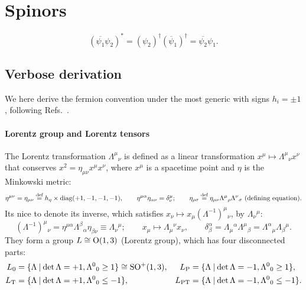 \documentclass[CheatSheet]{subfiles}
\newcommand{\LorTr}[2]{\Lambda^{#1}{}_{#2}}
\newcommand\defeq{\mathrel{\stackrel{\text{def}}=}}
\begin{document}
\changefontsizes{10pt}
\section{Spinors}

\changefontsizes{9pt}
\begin{equation}
 (\overline{\psi_1}\psi_2)^* = (\psi_2)^\dagger(\overline\psi_1)^\dagger = \overline{\psi_2}\psi_1.
\end{equation}


\subsection{Verbose derivation}
We here derive the fermion convention under the most generic with signs $h_i=\pm1$, following
Refs.~\cite{Kugo1}.

\paragraph{Lorentz group and Lorentz tensors}
The Lorentz transformation $\LorTr\mu\nu$ is defined as a linear transformation $x^\mu\mapsto\LorTr\mu\nu x^\nu$ that conserves $x^2=\eta_{\mu\nu}x^\mu x^\nu$, where $x^\mu$ is a spacetime point and $\eta$ is the Minkowski metric:
\begin{equation}
 \eta^{\mu\nu}=\eta_{\mu\nu}\defeq h_\eta\times\diag(+1,-1,-1,-1),\qquad
 \eta^{\mu\alpha}\eta_{\alpha\nu}=\delta^{\mu}_\nu;\qquad
 \eta_{\rho\sigma}\defeq\eta_{\mu\nu}\LorTr\mu\rho\LorTr\nu\sigma ~\text{(defining equation)}.
\label{eq:LorTr}
\end{equation}
Its nice to denote its inverse, which satisfies $x_\nu\mapsto x_\mu(\Lambda^{-1})^\mu{}_\nu$, by $\Lambda_\nu{}^\mu$:
\begin{equation}
 (\Lambda^{-1})^\mu{}_\nu = \eta^{\mu\alpha}\LorTr\beta\alpha\eta_{\beta\nu}
\equiv \Lambda_\nu{}^\mu;\qquad
x_\mu\mapsto \Lambda_\mu{}^\nu x_\nu,\qquad
\delta^\alpha_\beta
=\Lambda_\mu{}^\alpha\LorTr\mu\beta
=\LorTr\alpha\mu \Lambda_\beta{}^\mu.
\end{equation}
They form a group $L\cong\operatorname{\mathrm O}(1,3)$ (Lorentz group), which has four disconnected parts:
\begin{align}
 L\w 0  &=\{\Lambda\mathbin|\det\Lambda=+1, \LorTr00\ge1\}\cong \mathop{\mathrm{SO^+}}(1,3),&
 L\w P  &=\{\Lambda\mathbin|\det\Lambda=-1, \LorTr00\ge1\},\notag\\
 L\w T  &=\{\Lambda\mathbin|\det\Lambda=+1, \LorTr00\le-1\},&
 L\w{PT}&=\{\Lambda\mathbin|\det\Lambda=-1, \LorTr00\le-1\}.
\end{align}
\end{document}
